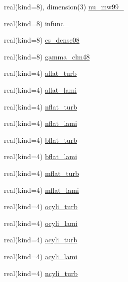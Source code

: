 \begin{DoxyCompactItemize}
\item 
real(kind=8), dimension(3) \hyperlink{namespacecanopy__air__coms_ae39097ce08183e89c3ed7ee9fba45cfb}{nu\+\_\+mw99\+\_}
\item 
real(kind=8) \hyperlink{namespacecanopy__air__coms_a2b6e9200766e533bfa58ae0da840321e}{infunc\+\_}
\item 
real(kind=8) \hyperlink{namespacecanopy__air__coms_a9f485b27a7dceff879db585b90660457}{cs\+\_\+dense08}
\item 
real(kind=8) \hyperlink{namespacecanopy__air__coms_ab14ce7f9e39fec25d950aa20ea6ca28b}{gamma\+\_\+clm48}
\item 
real(kind=4) \hyperlink{namespacecanopy__air__coms_a63aa3cee74a44dfccdad43b566c7149c}{aflat\+\_\+turb}
\item 
real(kind=4) \hyperlink{namespacecanopy__air__coms_a478fe27fc0f34c4b09208d0f99bae8e5}{aflat\+\_\+lami}
\item 
real(kind=4) \hyperlink{namespacecanopy__air__coms_a73459e396f65a6dd6e485d7ec6256a4c}{nflat\+\_\+turb}
\item 
real(kind=4) \hyperlink{namespacecanopy__air__coms_aebe2845272883354df889b85b1bad430}{nflat\+\_\+lami}
\item 
real(kind=4) \hyperlink{namespacecanopy__air__coms_a7af62fb9a2088fae5b7f939ead3b0d0f}{bflat\+\_\+turb}
\item 
real(kind=4) \hyperlink{namespacecanopy__air__coms_ac93abb13ce6ffe13f90e305450e3ae47}{bflat\+\_\+lami}
\item 
real(kind=4) \hyperlink{namespacecanopy__air__coms_ac97963c22db07629cd6f65bce4201a0b}{mflat\+\_\+turb}
\item 
real(kind=4) \hyperlink{namespacecanopy__air__coms_ae6457ac7f41cb8b0eead67da3f737a2e}{mflat\+\_\+lami}
\item 
real(kind=4) \hyperlink{namespacecanopy__air__coms_ad9c2e83605f784b3a5f68fc55b0d682d}{ocyli\+\_\+turb}
\item 
real(kind=4) \hyperlink{namespacecanopy__air__coms_aefa9b43396983e571ef5c4d1235b3884}{ocyli\+\_\+lami}
\item 
real(kind=4) \hyperlink{namespacecanopy__air__coms_a42c5385303996a52e2fce111d922eaf2}{acyli\+\_\+turb}
\item 
real(kind=4) \hyperlink{namespacecanopy__air__coms_a910e0e75420e6cd46075062c7da2b565}{acyli\+\_\+lami}
\item 
real(kind=4) \hyperlink{namespacecanopy__air__coms_a683ef393f66f3515c40cd7a3278eaff8}{ncyli\+\_\+turb}
\item 

\end{DoxyCompactItemize}
